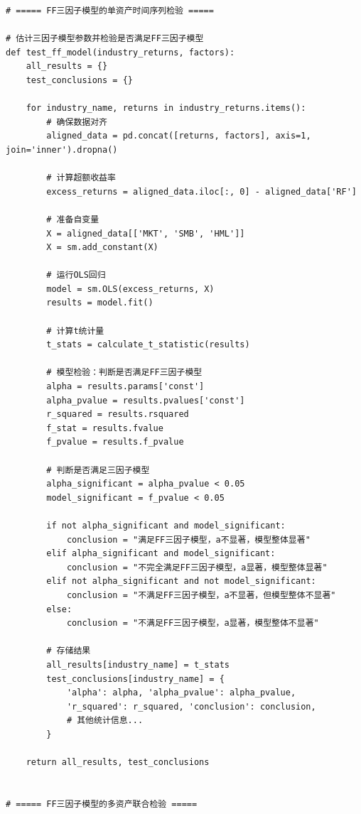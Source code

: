 \documentclass[12pt, a4paper]{article}
\begin{document}
\begin{lstlisting}[basicstyle=\small\ttfamily, breaklines=true, columns=fullflexible]
# ===== FF三因子模型的单资产时间序列检验 =====

# 估计三因子模型参数并检验是否满足FF三因子模型
def test_ff_model(industry_returns, factors):
    all_results = {}
    test_conclusions = {}
    
    for industry_name, returns in industry_returns.items():
        # 确保数据对齐
        aligned_data = pd.concat([returns, factors], axis=1, join='inner').dropna()
        
        # 计算超额收益率
        excess_returns = aligned_data.iloc[:, 0] - aligned_data['RF']
        
        # 准备自变量
        X = aligned_data[['MKT', 'SMB', 'HML']]
        X = sm.add_constant(X)
        
        # 运行OLS回归
        model = sm.OLS(excess_returns, X)
        results = model.fit()
        
        # 计算t统计量
        t_stats = calculate_t_statistic(results)
        
        # 模型检验：判断是否满足FF三因子模型
        alpha = results.params['const']
        alpha_pvalue = results.pvalues['const']
        r_squared = results.rsquared
        f_stat = results.fvalue
        f_pvalue = results.f_pvalue
        
        # 判断是否满足三因子模型
        alpha_significant = alpha_pvalue < 0.05
        model_significant = f_pvalue < 0.05
        
        if not alpha_significant and model_significant:
            conclusion = "满足FF三因子模型，a不显著，模型整体显著"
        elif alpha_significant and model_significant:
            conclusion = "不完全满足FF三因子模型，a显著，模型整体显著"
        elif not alpha_significant and not model_significant:
            conclusion = "不满足FF三因子模型，a不显著，但模型整体不显著"
        else:
            conclusion = "不满足FF三因子模型，a显著，模型整体不显著"
        
        # 存储结果
        all_results[industry_name] = t_stats
        test_conclusions[industry_name] = {
            'alpha': alpha, 'alpha_pvalue': alpha_pvalue, 
            'r_squared': r_squared, 'conclusion': conclusion,
            # 其他统计信息...
        }
    
    return all_results, test_conclusions


# ===== FF三因子模型的多资产联合检验 =====


\end{lstlisting}
\end{document}
